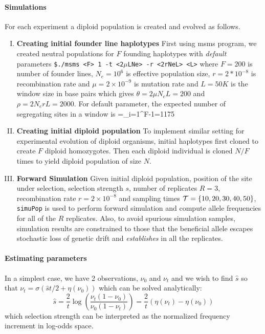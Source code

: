 \documentclass[11pt]{article}
\begin{document}
\paragraph{Simulations}
For each experiment a diploid population is created and evolved as 
follows. 
\begin{enumerate}[I.]
	\item {\bf Creating initial founder line haplotypes}
	First using msms program, we created neutral populations for $F$ 
	founding 
	haplotypes with \emph{default} parameters \texttt{\$./msms <F> 1 
	-t 
		<2$\mu$LNe> 
		-r <2rNeL> 
		<L>} 
	where $F=200$ is number of founder lines, $N_e=10^6$ is 
	effective 
	population size, $r=2*10^{-8}$ is recombination rate and 
	$\mu=2\times 
	10^{-9}$ is mutation rate and  $L=50K$ is the window size in 
	base pairs 
	which gives $\theta=2\mu N_eL=200$ and $\rho=2N_erL=2000$. 
	For 
	default 
	parameter, the expected number of segregating sites in a window 
	is 
	\beqq
	\Ebb[M]=\theta \sum_{i=1}^{F-1}=1175
	\eeqq
	\item{\bf Creating initial diploid population} 
	To implement similar setting for experimental evolution of diploid 
	organisms, 
	initial  haplotypes first cloned to create $F$ diploid homozygotes. 
	Then 
	each 
	diploid individual is  cloned $N/F$ times to yield diploid 
	population of 
	size 
	$N$.
	\item{\bf Forward Simulation}
	Given initial diploid population, position of the site under 
	selection, 
	selection 
	strength $s$, number of replicates $R=3$, recombination rate 
	$r=2\times10^{-8}$ 
	and sampling times ${\cal T}=\{10,20,30,40,50\}$, \texttt{simuPop} is 
	used to 
	perform
	forward simulation and  compute allele frequencies for all of the 
	$R$ 
	replicates. Also, to avoid spurious simulation samples, simulation 
	results 
	are constrained to those that the beneficial allele escapes 
	stochastic loss 
	of genetic drift and \emph{establishes} in all the replicates. 
\end{enumerate}

\paragraph{Estimating parameters} 
\label{sec:regression}
In a simplest case, we have 2 observations, $\nu_0$ and $\nu_t$ and we wish to 
find 
$\hat{s}$ so that $\nu_t=\sigma(\hat{s}t/2+\eta(\nu_0))$ which can be solved 
analytically:
\begin{equation}
\hat{s}=\frac{2}{t} \log \left( \frac{\nu_t(1-\nu_0)}{\nu_0 (1-\nu_t)} \right) 
= 
\frac{2}{t}  \left( \eta(\nu_t)-\eta(\nu_0)\right)
\label{eq:naive2point}
\end{equation}
which selection strength can be interpreted as the normalized frequency 
increment in log-odds space.
\end{document}
